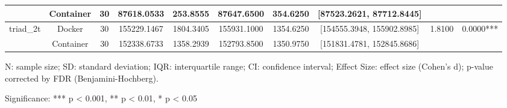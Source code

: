 \documentclass{article}
\begin{document}
\begin{table}[h]
\begin{tabular}{lccccccccc}
 & Container & 30 & 87618.0533 & 253.8555 & 87647.6500 & 354.6250 & [87523.2621, 87712.8445] &  &  \\
\midrule
\multirow{2}{*}{triad\_2t} & Docker & 30 & 155229.1467 & 1804.3405 & 155931.1000 & 1354.6250 & [154555.3948, 155902.8985] & 1.8100 & 0.0000*** \\
 & Container & 30 & 152338.6733 & 1358.2939 & 152793.8500 & 1350.9750 & [151831.4781, 152845.8686] &  &  \\
\midrule
\bottomrule
\end{tabular}
\begin{tablenotes}
\small
\item N: sample size; SD: standard deviation; IQR: interquartile range; CI: confidence interval; Effect Size: effect size (Cohen's d); p-value corrected by FDR (Benjamini-Hochberg).
\item Significance: *** p < 0.001, ** p < 0.01, * p < 0.05
\end{tablenotes}
\end{table}
\end{document}
